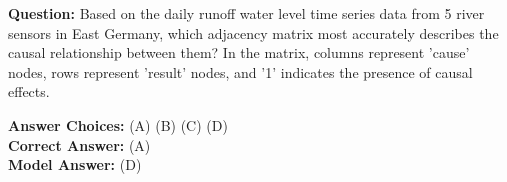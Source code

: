 \begin{ReasoningBox}[title=Question Understanding Error] %
        \textbf{Question:} Based on the daily runoff water level time series data from 5 river sensors in East Germany, which adjacency matrix most accurately describes the causal relationship between them? In the matrix, columns represent 'cause' nodes, rows represent 'result' nodes, and '1' indicates the presence of causal effects.
    

    \vspace{0.5em}

    \textbf{Answer Choices:} 
    (A)  \hfill
    (B)  \hfill
    (C)  \hfill
    (D) 
    \vspace{10pt}
    \\
    
    \noindent\textbf{Correct Answer:} \textcolor{correctgreen}{(A)} \\
    \textbf{Model Answer:} \textcolor{wrongred}{(D)}
    

\end{ReasoningBox}
